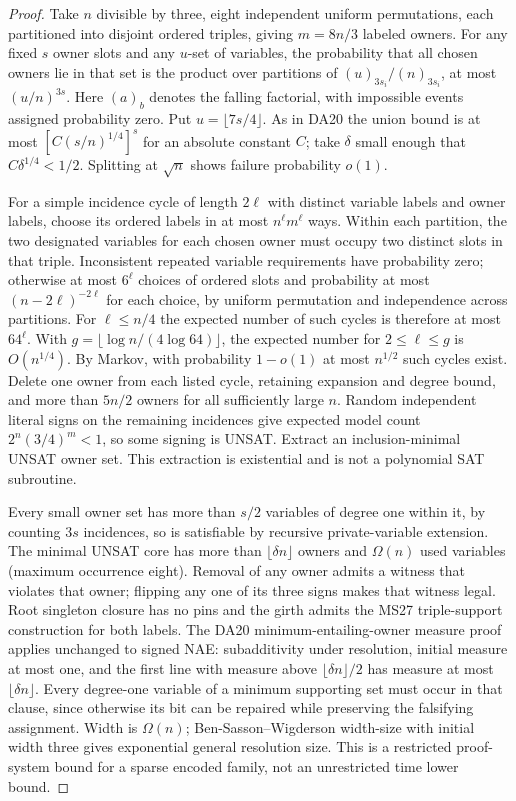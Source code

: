 \documentclass[11pt]{article}
\begin{document}
\begin{proof}
Take $n$ divisible by three, eight independent uniform permutations, each partitioned into disjoint ordered triples, giving $m=8n/3$ labeled owners. For any fixed $s$ owner slots and any $u$-set of variables, the probability that all chosen owners lie in that set is the product over partitions of $(u)_{3s_i}/(n)_{3s_i}$, at most $(u/n)^{3s}$. Here $(a)_b$ denotes the falling factorial, with impossible events assigned probability zero. Put $u=\lfloor7s/4\rfloor$. As in DA20 the union bound is at most $[C(s/n)^{1/4}]^s$ for an absolute constant $C$; take $\delta$ small enough that $C\delta^{1/4}<1/2$. Splitting at $\sqrt n$ shows failure probability $o(1)$.

For a simple incidence cycle of length $2\ell$ with distinct variable labels and owner labels, choose its ordered labels in at most $n^\ell m^\ell$ ways. Within each partition, the two designated variables for each chosen owner must occupy two distinct slots in that triple. Inconsistent repeated variable requirements have probability zero; otherwise at most $6^\ell$ choices of ordered slots and probability at most $(n-2\ell)^{-2\ell}$ for each choice, by uniform permutation and independence across partitions. For $\ell\le n/4$ the expected number of such cycles is therefore at most $64^\ell$. With $g=\lfloor\log n/(4\log64)\rfloor$, the expected number for $2\le\ell\le g$ is $O(n^{1/4})$. By Markov, with probability $1-o(1)$ at most $n^{1/2}$ such cycles exist. Delete one owner from each listed cycle, retaining expansion and degree bound, and more than $5n/2$ owners for all sufficiently large $n$. Random independent literal signs on the remaining incidences give expected model count $2^n(3/4)^m<1$, so some signing is UNSAT. Extract an inclusion-minimal UNSAT owner set. This extraction is existential and is not a polynomial SAT subroutine.

Every small owner set has more than $s/2$ variables of degree one within it, by counting $3s$ incidences, so is satisfiable by recursive private-variable extension. The minimal UNSAT core has more than $\lfloor\delta n\rfloor$ owners and $\Omega(n)$ used variables (maximum occurrence eight). Removal of any owner admits a witness that violates that owner; flipping any one of its three signs makes that witness legal. Root singleton closure has no pins and the girth admits the MS27 triple-support construction for both labels. The DA20 minimum-entailing-owner measure proof applies unchanged to signed NAE: subadditivity under resolution, initial measure at most one, and the first line with measure above $\lfloor\delta n\rfloor/2$ has measure at most $\lfloor\delta n\rfloor$. Every degree-one variable of a minimum supporting set must occur in that clause, since otherwise its bit can be repaired while preserving the falsifying assignment. Width is $\Omega(n)$; Ben-Sasson--Wigderson width-size with initial width three gives exponential general resolution size. This is a restricted proof-system bound for a sparse encoded family, not an unrestricted time lower bound.
\end{proof}
\end{document}
